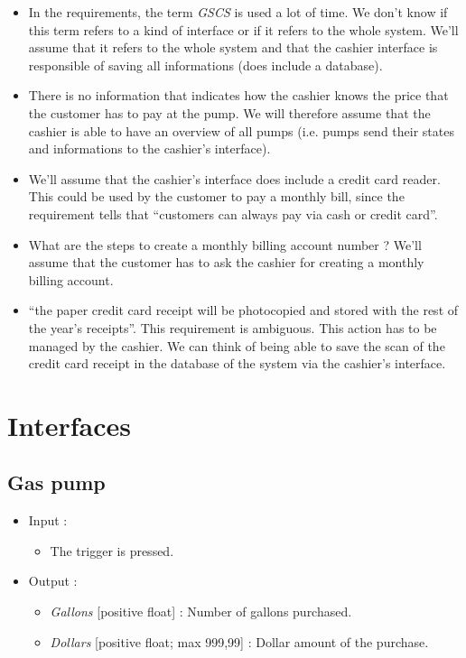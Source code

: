 \documentclass[11pt, a4paper]{article}
\newcommand{\data}[1]{\textit{#1}}
\begin{document}
\begin{itemize}

\item In the requirements, the term \textit{GSCS} is used a lot of time. We don't know if this term refers to a kind of interface or if it refers to the whole system. We'll assume that it refers to the whole system and that the cashier interface is responsible of saving all informations (does include a database).

\item There is no information that indicates how the cashier knows the price that the customer has to pay at the pump. We will therefore assume that the cashier is able to have an overview of all pumps (i.e. pumps send their states and informations to the cashier's interface).

\item We'll assume that the cashier's interface does include a credit card reader. This could be used by the customer to pay a monthly bill, since the requirement tells that \enquote{customers can always pay via cash or credit card}.

\item What are the steps to create a monthly billing account number ? We'll assume that the customer has to ask the cashier for creating a monthly billing account.

\item ``the paper credit card receipt will be photocopied and stored with the rest of the year’s receipts''. This requirement is ambiguous. This action has to be managed by the cashier. We can think of being able to save the scan of the credit card receipt in the database of the system via the cashier's interface.

\end{itemize}



\newpage
\section{Interfaces}

\subsection{Gas pump}

\begin{itemize}
\item Input :
		\begin{itemize}
		\item The trigger is pressed.
		\end{itemize}

\item Output :
		\begin{itemize}
		\item \data{Gallons} [positive float] : Number of gallons purchased. 
    \item \data{Dollars} [positive float; max 999,99] : Dollar amount of the purchase.
		\end{itemize}
\end{itemize}
\end{document}
